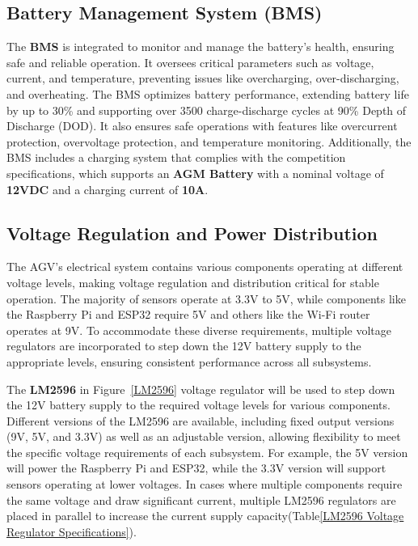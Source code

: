 \documentclass[../../main]{subfiles}
\begin{document}
\subsection{Battery Management System (BMS)}
The \textbf{BMS} is integrated to monitor and manage the battery's health, 
ensuring safe and reliable operation. It oversees critical parameters such as voltage, current, and temperature,
preventing issues like overcharging, over-discharging, and overheating. The BMS optimizes battery performance, 
extending battery life by up to 30\% and supporting over 3500 charge-discharge cycles at 90\% Depth of Discharge (DOD). 
It also ensures safe operations with features like overcurrent protection, overvoltage protection, and temperature monitoring. 
Additionally, the BMS includes a charging system that complies with the competition specifications, 
which supports an \textbf{AGM Battery} with a nominal voltage of \textbf{12VDC} and a charging current of \textbf{10A}.

\subsection{Voltage Regulation and Power Distribution}

The AGV's electrical system contains various components operating 
at different voltage levels, making voltage regulation and 
distribution critical for stable operation. The majority of 
sensors operate at 3.3V to 5V, while components like the Raspberry Pi 
and ESP32 require 5V and others like the Wi-Fi router operates at 9V. 
To accommodate these diverse requirements, multiple voltage regulators 
are incorporated to step down the 12V battery supply to the appropriate 
levels, ensuring consistent performance across all subsystems. 


The \textbf{LM2596} in Figure~\ref{LM2596} voltage regulator will be used to step down the 12V battery 
supply to the required voltage levels for various components. Different 
versions of the LM2596 are available, including fixed output versions 
(9V, 5V, and 3.3V) as well as an adjustable version, allowing flexibility 
to meet the specific voltage requirements of each subsystem. For example, 
the 5V version will power the Raspberry Pi and ESP32, while the 3.3V version 
will support sensors operating at lower voltages. In cases where multiple 
components require the same voltage and draw significant current, multiple 
LM2596 regulators are placed in parallel to increase the current supply 
capacity(Table\ref{LM2596 Voltage Regulator Specifications}).
\end{document}
